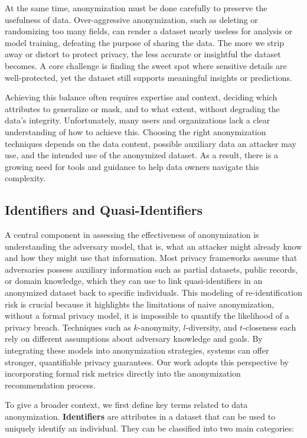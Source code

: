 \documentclass{article}
\begin{document}
At the same time, anonymization must be done carefully to preserve the usefulness of data. Over-aggressive anonymization, such as deleting or randomizing too many fields, can render a dataset nearly useless for analysis or model training, defeating the purpose of sharing the data. The more we strip away or distort to protect privacy, the less accurate or insightful the dataset becomes. A core challenge is finding the sweet spot where sensitive details are well-protected, yet the dataset still supports meaningful insights or predictions.

Achieving this balance often requires expertise and context, deciding which attributes to generalize or mask, and to what extent, without degrading the data’s integrity. Unfortunately, many users and organizations lack a clear understanding of how to achieve this. Choosing the right anonymization techniques depends on the data content, possible auxiliary data an attacker may use, and the intended use of the anonymized dataset. As a result, there is a growing need for tools and guidance to help data owners navigate this complexity.



\subsection{Identifiers and Quasi-Identifiers}

A central component in assessing the effectiveness of anonymization is understanding the adversary model, that is, what an attacker might already know and how they might use that information. Most privacy frameworks assume that adversaries possess auxiliary information such as partial datasets, public records, or domain knowledge, which they can use to link quasi-identifiers in an anonymized dataset back to specific individuals. This modeling of re-identification risk is crucial because it highlights the limitations of naive anonymization, without a formal privacy model, it is impossible to quantify the likelihood of a privacy breach. Techniques such as $k$-anonymity, $l$-diversity, and $t$-closeness each rely on different assumptions about adversary knowledge and goals. By integrating these models into anonymization strategies, systems can offer stronger, quantifiable privacy guarantees. Our work adopts this perspective by incorporating formal risk metrics directly into the anonymization recommendation process.


To give a broader context, we first define key terms related to data anonymization.
\textbf{Identifiers} are attributes in a dataset that can be used to uniquely identify an individual. They can be classified into two main categories:
\end{document}
